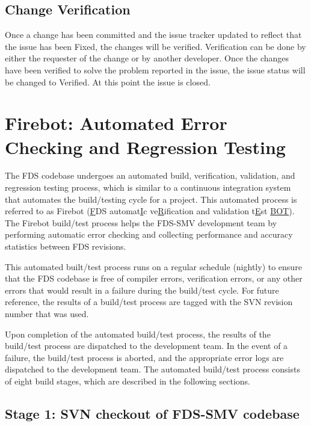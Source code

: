 \documentclass[11pt]{book}
\begin{document}
\subsection{Change Verification}

Once a change has been committed and the issue tracker updated to reflect that the issue has been {\ct Fixed},
the changes will be verified.  Verification can be done by either the requester of the change or by another
developer.  Once the changes have been verified to solve the problem reported in the issue, the issue status will
be changed to {\ct Verified}.  At this point the issue is closed.

\clearpage
\section{Firebot: Automated Error Checking and Regression Testing}

The FDS codebase undergoes an automated build, verification, validation, and regression testing process, which is similar to a continuous integration system that automates the build/testing cycle for a project. This automated process is referred to as Firebot (\underline{F}DS automat\underline{I}c ve\underline{R}ification and validation t\underline{E}st \underline{BOT}). The Firebot build/test process helps the FDS-SMV development team by performing automatic error checking and collecting performance and accuracy statistics between FDS revisions.

This automated built/test process runs on a regular schedule (nightly) to ensure that the FDS codebase is free of compiler errors, verification errors, or any other errors that would result in a failure during the build/test cycle. For future reference, the results of a build/test process are tagged with the SVN revision number that was used. 

Upon completion of the automated build/test process, the results of the build/test process are dispatched to the development team. In the event of a failure, the build/test process is aborted, and the appropriate error logs are dispatched to the development team. The automated build/test process consists of eight build stages, which are described in the following sections.

\subsection*{Stage 1: SVN checkout of FDS-SMV codebase}
\end{document}
